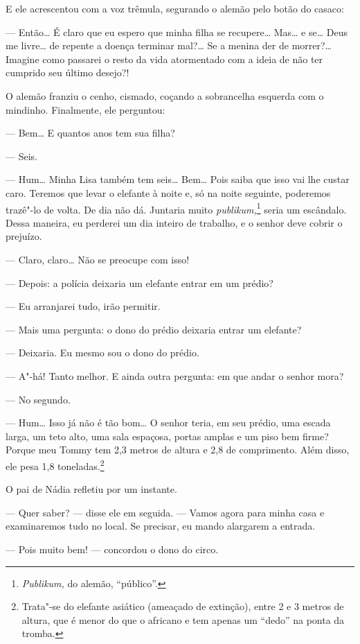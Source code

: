 E ele acrescentou com a voz trêmula, segurando o alemão pelo botão do
casaco:

--- Então\ldots{} É claro que eu espero que minha filha se re­cupere\ldots{}
Mas\ldots{} e se\ldots{} Deus me livre\ldots{} de repente a doen­ça terminar mal?\ldots{} Se
a menina der de morrer?\ldots{} Imagine como passarei o resto da vida
atormentado com a ideia de não ter cumprido seu último desejo?!

O alemão franziu o cenho, cismado, coçando a so­brancelha esquerda com o
mindinho. Finalmente, ele perguntou:

--- Bem\ldots{} E quantos anos tem sua filha?

--- Seis.

--- Hum\ldots{} Minha Lisa também tem seis\ldots{} Bem\ldots{} Pois saiba que isso vai
lhe custar caro. Teremos que levar o elefante à noite e, só na noite
seguinte, poderemos trazê"-lo de volta. De dia não dá. Juntaria muito
\emph{publikum,}\footnote{\emph{Publikum,} do alemão, ``público''.}
seria um escândalo. Dessa maneira, eu perderei um dia inteiro de
trabalho, e o senhor deve cobrir o prejuízo.

--- Claro, claro\ldots{} Não se preocupe com isso!

--- Depois: a polícia deixaria um elefante entrar em um prédio?

--- Eu arranjarei tudo, irão permitir.

--- Mais uma pergunta: o dono do prédio deixaria entrar um elefante?

--- Deixaria. Eu mesmo sou o dono do prédio.

--- A"-há! Tanto melhor. E ainda outra pergunta: em que andar o senhor
mora?

--- No segundo.

--- Hum\ldots{} Isso já não é tão bom\ldots{} O senhor teria, em seu prédio, uma
escada larga, um teto alto, uma sala espaçosa, portas amplas e um piso
bem firme? Porque meu Tommy tem 2,3 metros de altura e 2,8 de
compri­mento. Além disso, ele pesa 1,8 toneladas.\footnote{Trata"-se
  do elefante asiático (ameaçado de extinção), entre 2 e 3 metros de
  altura, que é menor do que o africano e tem apenas um ``dedo'' na
  ponta da tromba.}

O pai de Nádia refletiu por um instante.

--- Quer saber? --- disse ele em seguida. --- Vamos agora para minha
casa e examinaremos tudo no local. Se precisar, eu mando alargarem a
entrada.

--- Pois muito bem! --- concordou o dono do circo.

